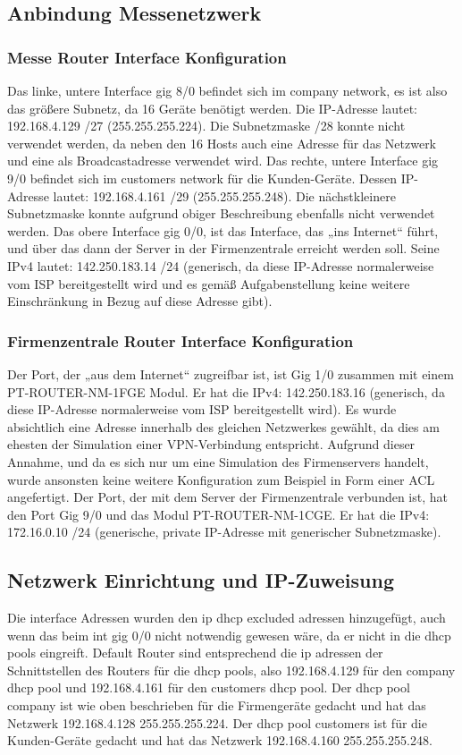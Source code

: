 \newpage

\subsection{Anbindung Messenetzwerk}
\subsubsection{Messe Router Interface Konfiguration}
Das linke, untere Interface gig 8/0 befindet sich im company network, es ist also das größere Subnetz, da 16 Geräte benötigt werden. Die IP-Adresse lautet: 192.168.4.129 /27 (255.255.255.224). Die Subnetzmaske /28 konnte nicht verwendet werden, da neben den 16 Hosts auch eine Adresse für das Netzwerk und eine als Broadcastadresse verwendet wird.
Das rechte, untere Interface gig 9/0 befindet sich im customers network für die Kunden-Geräte. Dessen IP-Adresse lautet: 192.168.4.161 /29 (255.255.255.248). Die nächstkleinere Subnetzmaske konnte aufgrund obiger Beschreibung ebenfalls nicht verwendet werden.
Das obere Interface gig 0/0, ist das Interface, das „ins Internet“ führt, und über das dann der Server in der Firmenzentrale erreicht werden soll. Seine IPv4 lautet: 142.250.183.14 /24 (generisch, da diese IP-Adresse normalerweise vom ISP bereitgestellt wird und es gemäß Aufgabenstellung keine weitere Einschränkung in Bezug auf diese Adresse gibt).

\subsubsection{Firmenzentrale Router Interface Konfiguration}
Der Port, der „aus dem Internet“ zugreifbar ist, ist Gig 1/0 zusammen mit einem PT-ROUTER-NM-1FGE Modul. Er hat die IPv4: 142.250.183.16 (generisch, da diese IP-Adresse normalerweise vom ISP bereitgestellt wird). Es wurde absichtlich eine Adresse innerhalb des gleichen Netzwerkes gewählt, da dies am ehesten der Simulation einer VPN-Verbindung entspricht. Aufgrund dieser Annahme, und da es sich nur um eine Simulation des Firmenservers handelt, wurde ansonsten keine weitere Konfiguration zum Beispiel in Form einer ACL angefertigt.
Der Port, der mit dem Server der Firmenzentrale verbunden ist, hat den Port Gig 9/0 und das Modul PT-ROUTER-NM-1CGE. Er hat die IPv4: 172.16.0.10 /24 (generische, private IP-Adresse mit generischer Subnetzmaske).


\subsection{Netzwerk Einrichtung und IP-Zuweisung}
Die interface Adressen wurden den ip dhcp excluded adressen hinzugefügt, auch wenn das beim int gig 0/0 nicht notwendig gewesen wäre, da er nicht in die dhcp pools eingreift. Default Router sind entsprechend die ip adressen der Schnittstellen des Routers für die dhcp pools, also 192.168.4.129 für den company dhcp pool und 192.168.4.161 für den customers dhcp pool. Der dhcp pool company ist wie oben beschrieben für die Firmengeräte gedacht und hat das Netzwerk 192.168.4.128 255.255.255.224. Der dhcp pool customers ist für die Kunden-Geräte gedacht und hat das Netzwerk 192.168.4.160 255.255.255.248.

